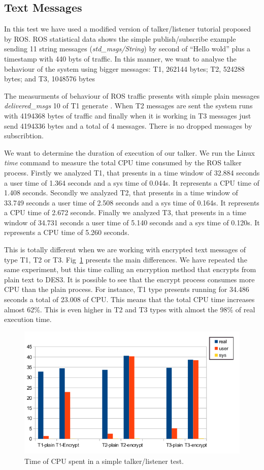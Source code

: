 \documentclass[journal,twoside]{JoPhA}
\begin{document}
\subsection{Text Messages}


In this test we have used a modified version of talker/listener tutorial proposed by ROS. 
ROS statistical data shows the simple publish/subscribe example sending 11 string messages ({\em std\_msgs/String}) by second of ``Hello wold'' plus a timestamp with 440 byts of traffic.
In this manner, we want to analyse the behaviour of the system using bigger messages: T1, 262144 bytes; T2,  524288 bytes; and T3, 1048576 bytes 

The measurments of behaviour of ROS traffic presents with simple plain messages {\em delivered\_msgs} 10 of T1 generate . When T2 messages are sent the system runs with 4194368 bytes of traffic and finally when it is working in  T3 messages just send 4194336 bytes and a total of 4 messages. There is no dropped messages by subscribtion.

We want to determine the duration of execution of our talker. We run the Linux {\em time} command to measure the total CPU time consumed by the ROS talker process. 
Firstly we analyzed T1, that presents in a time window of 32.884 seconds a user time of  1.364 seconds and a sys time of 0.044s. It represents a CPU time of 1.408 seconds.
Secondly we analyzed T2, that presents in a time window of 33.749 seconds a user time of  2.508 seconds and a sys time of 0.164s. It represents a CPU time of 2.672 seconds.
Finally we analyzed T3, that presents in a time window of 34.731 seconds a user time of  5.140 seconds and a sys time of 0.120s. It represents a CPU time of 5.260 seconds.

This is totally different when we are working with encrypted text messages of type T1, T2 or T3. Fig~\ref{fig:time_text_CPU} presents the main differences. We have repeated the same experiment, but this time calling an encryption method that encrypts from plain text to DES3. It is possible to see that the encrypt process consumes more CPU than  the plain process.
For instance, T1 type presents running for  34.486 seconds a total of 23.008 of CPU. This means that the total CPU time increases almost 62\%. This is even higher in T2 and T3 types with almost the 98\% of real execution time.
\begin{figure}[ht!]
    \centering
    \includegraphics[width=.5\textwidth]{Tiempos_CPU_cifrado_texto.png}
    \caption{Time of CPU spent in a simple talker/listener test.}
  \label{fig:time_text_CPU}
\end{figure}
\end{document}
